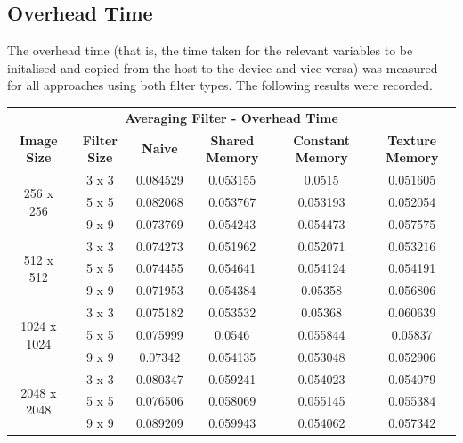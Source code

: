 \documentclass[10pt]{article}
\begin{document}
\subsection{Overhead Time}
The overhead time (that is, the time taken for the relevant variables to be initalised and copied from the host to the device and vice-versa) was measured for all approaches using both filter types. The following results were recorded.
\begin{table}[H]
\small
\begin{tabular}{cccccc}
\multicolumn{6}{c}{\textbf{Averaging Filter - Overhead Time}}                                                                                      \\
\textbf{Image Size}          & \textbf{Filter Size} & \textbf{Naive} & \textbf{Shared Memory} & \textbf{Constant Memory} & \textbf{Texture Memory} \\ \hline
\multirow{3}{*}{256 x 256}   & 3 x 3                & 0.084529       & 0.053155               & 0.0515                   & 0.051605                \\
                             & 5 x 5                & 0.082068       & 0.053767               & 0.053193                 & 0.052054                \\
                             & 9 x 9                & 0.073769       & 0.054243               & 0.054473                 & 0.057575                \\ \hline
\multirow{3}{*}{512 x 512}   & 3 x 3                & 0.074273       & 0.051962               & 0.052071                 & 0.053216                \\
                             & 5 x 5                & 0.074455       & 0.054641               & 0.054124                 & 0.054191                \\
                             & 9 x 9                & 0.071953       & 0.054384               & 0.05358                  & 0.056806                \\ \hline
\multirow{3}{*}{1024 x 1024} & 3 x 3                & 0.075182       & 0.053532               & 0.05368                  & 0.060639                \\
                             & 5 x 5                & 0.075999       & 0.0546                 & 0.055844                 & 0.05837                 \\
                             & 9 x 9                & 0.07342        & 0.054135               & 0.053048                 & 0.052906                \\ \hline
\multirow{3}{*}{2048 x 2048} & 3 x 3                & 0.080347       & 0.059241               & 0.054023                 & 0.054079                \\
                             & 5 x 5                & 0.076506       & 0.058069               & 0.055145                 & 0.055384                \\
                             & 9 x 9                & 0.089209       & 0.059943               & 0.054062                 & 0.057342               
\end{tabular}
\end{table}
\end{document}
